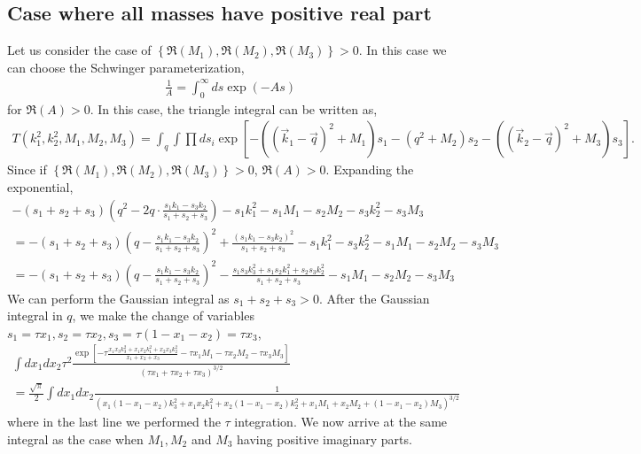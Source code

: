 \documentclass[twoside]{article}
\begin{document}
\subsection{Case where all masses have positive real part}
Let us consider the case of $\left\{ \Re(M_1),\Re(M_2),\Re(M_3) \right\} > 0$. In this case we can choose the Schwinger parameterization,
\begin{align}
  \frac{1}{A} = \int^{\infty}_0ds \exp(-As)
\end{align}
for $\Re(A)>0$. In this case, the triangle integral can be written as,
\begin{align}
  T(k^2_1,k^2_2,M_1,M_2,M_3) = \int_{q}\int \prod ds_i \exp\left[ -\left((\vec{k}_1 - \vec{q})^2 + M_1\right)s_1 - (q^2 + M_2)s_2 - \left(
  (\vec{k}_2 - \vec{q})^2 + M_3 \right)s_3 \right].
\end{align}
Since if $\left\{ \Re(M_1),\Re(M_2),\Re(M_3) \right\}> 0$, $\Re(A)>0$. Expanding the exponential,
\begin{align}
  -(s_1 + s_2 + s_3)\left( q^2 - 2q\cdot\frac{s_1k_1 - s_3k_2}{s_1 + s_2 + s_3} \right) - s_1k^2_1 - s_1M_1 - s_2M_2 - s_3k^2_2 - s_3M_3\\
  = -(s_1 + s_2 + s_3)\left(q - \frac{s_1k_1 - s_3k_2}{s_1 + s_2 + s_3}\right)^2 + \frac{(s_1k_1 - s_3k_2)^2}{s_1 + s_2 + s_3} -s_1k^2_1 - s_3k^2_2 -
  s_1M_1 - s_2M_2 - s_3M_3\\
  = -(s_1 + s_2 + s_3)\left( q - \frac{s_1k_1 - s_3k_2}{s_1 + s_2 + s_3} \right)^2 - \frac{s_1s_3k^2_3 + s_1s_2k^2_1 +
  s_2s_3k^2_2}{s_1 + s_2 + s_3} - s_1M_1 - s_2M_2 - s_3M_3
\end{align}
We can perform the Gaussian integral as $s_1 + s_2 + s_3 > 0$. After the Gaussian integral in $q$, we make the change of variables $s_1 = \tau x_1, s_2 = \tau x_2, s_3 = \tau(1 - x_1 - x_2) = \tau x_3$,
\begin{align}
  \int dx_1dx_2\tau^2\frac{\exp\left[ -\tau\frac{x_1x_3k^2_3 + x_1x_2k^2_1 + x_2x_3k^2_2}{x_1 + x_2 + x_3} - \tau x_1M_1 - \tau x_2M_2 - \tau x_3M_3
  \right]}{(\tau x_1 + \tau x_2 + \tau x_3)^{3/2}}\\
  = \frac{\sqrt{\pi}}{2}\int dx_1dx_2 \frac{1}{\left(x_1(1 - x_1 - x_2)k^2_3 + x_1x_2k^2_1 + x_2(1 - x_1 - x_2)k^2_2 + x_1M_1 + x_2M_2 +
  (1 - x_1 - x_2)M_3\right)^{3/2}}
\end{align}
where in the last line we performed the $\tau$ integration. We now arrive at the same integral as the case when $M_1, M_2$ and $M_3$ having
positive imaginary parts.
\end{document}
